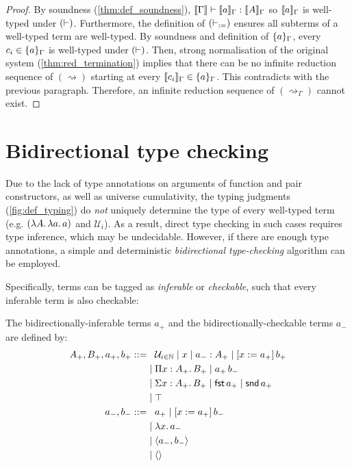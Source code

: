 \documentclass[twoside]{report}
\begin{document}
\begin{proof}
By soundness (\cref{thm:def_soundness}), $\llbracket{\Gamma}\rrbracket \vdash \llbracket{a}\rrbracket_\Gamma : \llbracket{A}\rrbracket_\Gamma$ so $\llbracket{a}\rrbracket_\Gamma$ is well-typed under $(\vdash)$. Furthermore, the definition of $(\vdash_{:=})$ ensures all subterms of a well-typed term are well-typed. By soundness and definition of $\{{a}\}_\Gamma$, every $c_i\in\{{a}\}_\Gamma$ is well-typed under $(\vdash)$. Then, strong normalisation of the original system (\cref{thm:red_termination}) implies that there can be no infinite reduction sequence of $(\rightsquigarrow)$ starting at every $\llbracket{c_i}\rrbracket_\Gamma \in \{{a}\}_\Gamma$. This contradicts with the previous paragraph. Therefore, an infinite reduction sequence of $(\rightsquigarrow_\Gamma)$ cannot exist.
\end{proof}

\section{Bidirectional type checking}
\label{sec:bidirectional_type_checking}

Due to the lack of type annotations on arguments of function and pair constructors, as well as universe cumulativity, the typing judgments (\cref{fig:def_typing}) do \emph{not} uniquely determine the type of every well-typed term (e.g. $(\lambda{A}.\,{\lambda{a}.\,{a}})$ and $\mathcal U_i$). As a result, direct type checking in such cases requires type inference, which may be undecidable. However, if there are enough type annotations, a simple and deterministic \emph{bidirectional type-checking} algorithm can be employed.

Specifically, terms can be tagged as \emph{inferable} or \emph{checkable}, such that every inferable term is also checkable:

\begin{definition}
\label{def:bidirectional_terms}
The bidirectionally-inferable terms $a_+$ and the bidirectionally-checkable terms $a_-$ are defined by: $$
\begin{aligned}
A_+,B_+,a_+,b_+ ::=
    & \phantom{{}\mid{}} \mathcal U_{i \in \mathbb N} \mid x \mid {a_-} : {A_+} \mid \llet x {a_+} {b_+} \\
    & \mid \ppi x {A_+} {B_+} \mid \app {a_+} {b_-} \\
    & \mid \sig x {A_+} {B_+} \mid \fst {a_+} \mid \snd {a_+} \\
    & \mid \unit \\
a_-,b_- ::=
    & \phantom{{}\mid{}} a_+ \mid \llet x {a_+} {b_-} \\
    & \mid \lam x {a_-} \\
    & \mid \pair {a_-} {b_-} \\
    & \mid \sstar \\
\end{aligned}
$$
\end{definition}
\end{document}
